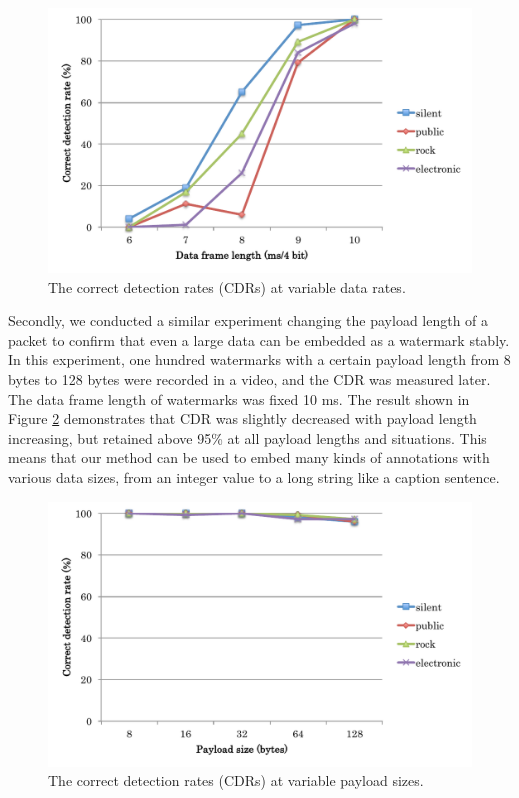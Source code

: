 \begin{figure}[htbp]
 \begin{center}
  \includegraphics[width=120mm]{evaluation_reliability_bitrate.pdf}
 \end{center}
 \caption{The correct detection rates (CDRs) at variable data rates.}
 \label{fig:eval_reli_btrt}
\end{figure}

Secondly, we conducted a similar experiment changing the payload length of a packet to confirm that even a large data can be embedded as a watermark stably.
In this experiment, one hundred watermarks with a certain payload length from 8 bytes to 128 bytes were recorded in a video, and the CDR was measured later.
The data frame length of watermarks was fixed 10 ms.
The result shown in Figure \ref{fig:eval_reli_pyld} demonstrates that CDR was slightly decreased with payload length increasing, but retained above 95\% at all payload lengths and situations.
This means that our method can be used to embed many kinds of annotations with various data sizes, from an integer value to a long string like a caption sentence.

\begin{figure}[htbp]
 \begin{center}
  \includegraphics[width=120mm]{evaluation_reliability_payload.pdf}
 \end{center}
 \caption{The correct detection rates (CDRs) at variable payload sizes.}
 \label{fig:eval_reli_pyld}
\end{figure}

